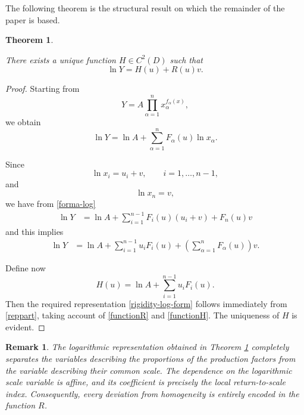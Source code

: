 \documentclass[12pt]{amsart}
\newtheorem{theorem}{Theorem}[section]
\newtheorem{remark}{Remark}[section]
\begin{document}
The following theorem is the structural result on which the remainder
of the paper is based.

\begin{theorem}
\label{thm:logrepresentation}

There exists a unique function
\(
H\in C^2(D)
\)
such that
\begin{equation}\label{rigidity-log-form}
\ln Y
=
H(u)+R(u)v.
\end{equation}

\end{theorem}

\begin{proof}

Starting from
\[
Y
=
A
\prod_{\alpha=1}^{n}
x_\alpha^{f_\alpha(x)},
\]
we obtain
\begin{equation}\label{forma-log}
\ln Y
=
\ln A
+
\sum_{\alpha=1}^{n}
F_\alpha(u)\ln x_\alpha.
\end{equation}

Since
\[
\ln x_i=u_i+v,
\qquad
i=1,\ldots,n-1,
\]
and
\[
\ln x_n=v,
\]
we have from \eqref{forma-log}
\[
\begin{aligned}
\ln Y
&=
\ln A
+
\sum_{i=1}^{n-1}
F_i(u)(u_i+v)
+
F_n(u)v
\end{aligned}
\]
and this implies
\begin{equation}\label{reppart}
\begin{aligned}
\ln Y
&=
\ln A
+
\sum_{i=1}^{n-1}
u_iF_i(u)
+
\left(
\sum_{\alpha=1}^{n}
F_\alpha(u)
\right)v.
\end{aligned}
\end{equation}


Define now
\begin{equation}\label{functionH}
H(u)
=
\ln A
+
\sum_{i=1}^{n-1}
u_iF_i(u).
\end{equation}
Then the required representation \eqref{rigidity-log-form} follows immediately from \eqref{reppart}, taking account of \eqref{functionR} and \eqref{functionH}. The uniqueness of \(H\) is evident.

\end{proof}

\begin{remark}

The logarithmic representation obtained in Theorem \ref{thm:logrepresentation} completely separates the variables
describing the proportions of the production factors from the variable
describing their common scale. The dependence on the logarithmic scale variable is affine, and its
coefficient is precisely the local return-to-scale index.
Consequently, every deviation from homogeneity is entirely encoded in
the function \(R\).

\end{remark}
\end{document}
